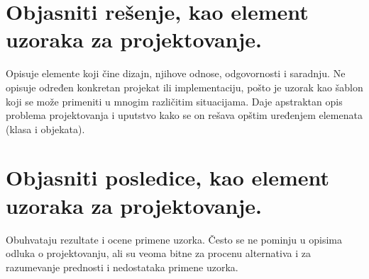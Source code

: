 \documentclass[a4paper]{article}
\begin{document}
\section{Objasniti rešenje, kao element uzoraka za projektovanje.}
  Opisuje elemente koji čine dizajn, njihove odnose, odgovornosti i saradnju.
  Ne opisuje određen konkretan projekat ili implementaciju, 
  pošto je uzorak kao šablon koji se može primeniti u mnogim različitim situacijama.
  Daje apstraktan opis problema projektovanja i uputstvo kako se on rešava opštim uređenjem 
  elemenata (klasa i objekata).

\section{Objasniti posledice, kao element uzoraka za projektovanje.}
  Obuhvataju rezultate i ocene primene uzorka.
  Često se ne pominju u opisima odluka o projektovanju, 
  ali su veoma bitne za procenu alternativa i za razumevanje prednosti 
  i nedostataka primene uzorka.
\end{document}
